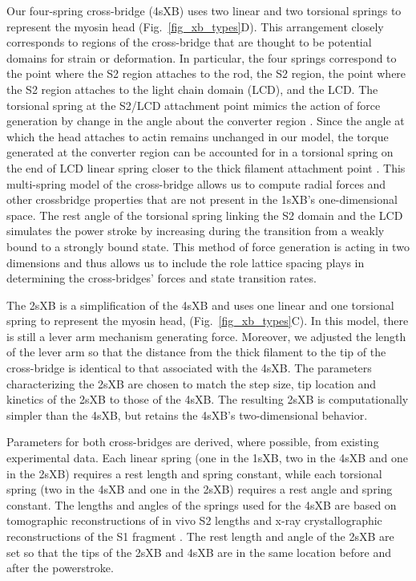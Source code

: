 \documentclass[]{article}
\begin{document}
Our four-spring cross-bridge (4sXB) uses two linear and two torsional springs to represent the myosin head (Fig.~\ref{fig_xb_types}D).
This arrangement closely corresponds to regions of the cross-bridge that are thought to be potential domains for strain or deformation. 
In particular, the four springs correspond to the point where the S2 region attaches to the rod, the S2 region, the point where the S2 region attaches to the light chain domain (LCD), and the LCD. 
The torsional spring at the S2/LCD attachment point mimics the action of force generation by change in the angle about the converter region \citep{Houdusse2000, Houdusse2001}. %
Since the angle at which the head attaches to actin remains unchanged in our model, the torque generated at the converter region can be accounted for in a torsional spring on the end of LCD linear spring closer to the thick filament attachment point \citep{Lauzon2001}. %
This multi-spring model of the cross-bridge allows us to compute radial forces and other crossbridge properties that are not present in the 1sXB's one-dimensional space. 
The rest angle of the torsional spring linking the S2 domain and the LCD simulates the power stroke by increasing during the transition from a weakly bound to a strongly bound state.
This method of force generation is acting in two dimensions and thus allows us to include the role lattice spacing plays in determining the cross-bridges' forces and state transition rates.

The 2sXB is a simplification of the 4sXB and uses one linear and one torsional spring to represent the myosin head, (Fig.~\ref{fig_xb_types}C).
In this model, there is still a lever arm mechanism generating force.  
Moreover, we adjusted the length of the lever arm so that the distance from the thick filament to the tip of the cross-bridge is identical to that associated with the 4sXB.
The parameters characterizing the 2sXB are chosen to match the step size, tip location and kinetics of the 2sXB to those of the 4sXB. 
The resulting 2sXB is computationally simpler than the 4sXB, but retains the 4sXB's two-dimensional behavior.

Parameters for both cross-bridges are derived, where possible, from existing experimental data.  
Each linear spring (one in the 1sXB, two in the 4sXB and one in the 2sXB) requires a rest length and spring constant, while each torsional spring (two in the 4sXB and one in the 2sXB) requires a rest angle and spring constant.
The lengths and angles of the springs used for the 4sXB are based on tomographic reconstructions of in vivo S2 lengths and x-ray crystallographic reconstructions of the S1 fragment \citep{Taylor1999, Rayment1993}.
The rest length and angle of the 2sXB are set so that the tips of the 2sXB and 4sXB are in the same location before and after the powerstroke.
\end{document}
